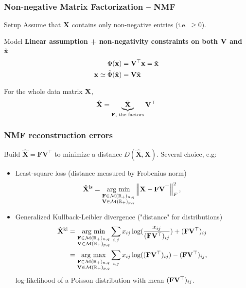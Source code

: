 \documentclass{beamer}\usepackage[]{graphicx}\usepackage[]{color}
\begin{document}
\begin{frame}
  \frametitle{Non-negative Matrix Factorization -- NMF}
  
  \begin{block}{Setup}
  Assume that $\mathbf{X}$ contains only non-negative entries (i.e. $\geq 0$).
  \end{block}
  
  \begin{block}{Model}
   \alert{\bf Linear assumption + non-negativity constraints on both $\mathbf{V}$ and $\tilde{\mathbf{x}}$}
    \begin{align*}
      \Phi(\mathbf{x}) & = \mathbf{V}^\top \mathbf{x}  = \tilde{\mathbf{x}} \\  
      \mathbf{x} \simeq \tilde{\Phi}(\tilde{\mathbf{x}}) & = \mathbf{V} \tilde{\mathbf{x}}
    \end{align*}

  For the whole data matrix $\mathbf{X}$,
  \[
    \hat{\mathbf{X}} = \underbrace{\tilde{\mathbf{X}}}_{\mathbf{F}, \text{ the factors}} \mathbf{V}^\top 
  \]
  \end{block}

\end{frame}

\begin{frame}[fragile]
  \frametitle{NMF reconstruction errors}
  
  Build $\hat{\mathbf{X}} = \mathbf{FV}^\top$ to minimize a distance $D(\hat{\mathbf{X}}, \mathbf{X})$. \alert{Several choice, e.g:}
    \begin{itemize}
    \item Least-square loss (distance measured by Frobenius norm)
    \[ \hat{\mathbf{X}}^{\text{ls}} =  \mathop{\mathrm{arg\ min}}_{\substack{\mathbf{F}\in\mathcal{M}(\mathbb{R}_+)_{n,q}\\\mathbf{V}\in\mathcal{M}(\mathbb{R}_+)_{p,q}}} \left\|     \mathbf{X} - \mathbf{FV}^\top \right\|_F^2,
\]
    \item Generalized Kullback-Leibler divergence ("distance" for distributions)
    \begin{align*}
    \hat{\mathbf{X}}^{\text{kl}} & =  \mathop{\mathrm{arg\ min}}_{\substack{\mathbf{F}\in\mathcal{M}(\mathbb{R}_+)_{n,q}\\ \mathbf{V}\in\mathcal{M}(\mathbb{R}_+)_{p,q}}} \sum_{i,j} x_{ij} \log(\frac{x_{ij}}{(\mathbf{F}\mathbf{V}^\top)_{ij}}) + (\mathbf{F}\mathbf{V}^\top)_{ij} \\
    & = \mathop{\mathrm{arg\ max}}_{\substack{\mathbf{F}\in\mathcal{M}(\mathbb{R}_+)_{n,q}\\ \mathbf{V}\in\mathcal{M}(\mathbb{R}_+)_{p,q}}} \sum_{i,j} x_{ij} \log((\mathbf{F}\mathbf{V}^\top)_{ij}) - (\mathbf{F}\mathbf{V}^\top)_{ij},\\
    \end{align*}
    \rsa log-likelihood of a Poisson distribution with mean $(\mathbf{F}\mathbf{V}^\top)_{ij}$.
    \end{itemize}
\end{frame}
\end{document}
